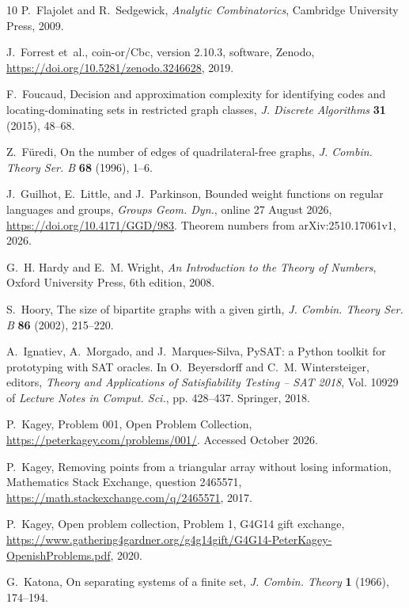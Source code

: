 \documentclass[12pt]{article}
\theoremstyle{plain}
\theoremstyle{definition}
\theoremstyle{remark}
\begin{document}
\begin{thebibliography}{10}
P.~Flajolet and R.~Sedgewick, {\em Analytic Combinatorics}, Cambridge
  University Press, 2009.

J.~Forrest et~al., coin-or/{Cbc}, version 2.10.3, software, Zenodo,
  \url{https://doi.org/10.5281/zenodo.3246628}, 2019.

F.~Foucaud, Decision and approximation complexity for identifying codes and
  locating-dominating sets in restricted graph classes, {\em J. Discrete
  Algorithms} {\bf 31} (2015), 48--68.

Z.~F{\"u}redi, On the number of edges of quadrilateral-free graphs, {\em J.
  Combin. Theory Ser. B} {\bf 68} (1996), 1--6.

J.~Guilhot, E.~Little, and J.~Parkinson, Bounded weight functions on regular
  languages and groups, \emph{Groups Geom. Dyn.}, online 27 August 2026,
  \url{https://doi.org/10.4171/GGD/983}. Theorem numbers from
  arXiv:2510.17061v1, 2026.

G.~H. Hardy and E.~M. Wright, {\em An Introduction to the Theory of Numbers},
  Oxford University Press, 6th edition, 2008.

S.~Hoory, The size of bipartite graphs with a given girth, {\em J. Combin.
  Theory Ser. B} {\bf 86} (2002), 215--220.

A.~Ignatiev, A.~Morgado, and J.~Marques-Silva, {PySAT}: a {P}ython toolkit for
  prototyping with {SAT} oracles.
\newblock In O.~Beyersdorff and C.~M. Wintersteiger, editors, {\em Theory and
  Applications of Satisfiability Testing -- {SAT} 2018}, Vol. 10929 of {\em
  Lecture Notes in Comput. Sci.}, pp.  428--437. Springer, 2018.

P.~Kagey, Problem 001, {O}pen {P}roblem {C}ollection,
  \url{https://peterkagey.com/problems/001/}.
\newblock Accessed October 2026.

P.~Kagey, Removing points from a triangular array without losing information,
  Mathematics Stack Exchange, question 2465571,
  \url{https://math.stackexchange.com/q/2465571}, 2017.

P.~Kagey, Open problem collection, {P}roblem 1, G4G14 gift exchange,
  \url{https://www.gathering4gardner.org/g4g14gift/G4G14-PeterKagey-OpenishProblems.pdf},
  2020.

G.~Katona, On separating systems of a finite set, {\em J. Combin. Theory} {\bf
  1} (1966), 174--194.


\end{thebibliography}
\end{document}
